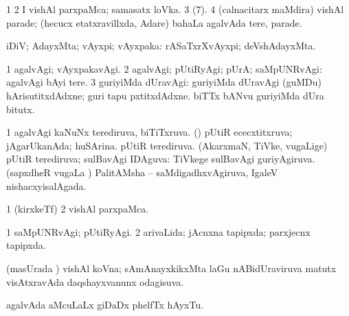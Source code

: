 {{{{{{\noindent 
\gl{\pagu}
\bmng
\bnum
\num{1}  
\num{2}  I vishAl parxpaMca; samasatx loVka. 
\num{3}  (\pagu $7$). 
\num{4}  (calnacitarx maMdira) vishAl parade; (hecucx etatxravillxda, Adare) bahaLa agalvAda tere, parade. 
\enum
\emng
\eentry

\bentry
{} 
\gl{\saupa}
\bmng
iDiV; AdayxMta; vAyxpi; vAyxpaka:  rASaTxrXvAyxpi; deVshAdayxMta. 
\emng
\eentry

\bentry
{} 
\gl{\kirxvi}
\expl{}
\bmng
\bnum
\num{1} agalvAgi; vAyxpakavAgi. 
\num{2} agalvAgi; pUtiRyAgi; pUrA; saMpUNRvAgi:  agalvAgi bAyi tere. 
\num{3} guriyiMda dUravAgi:  guriyiMda dUravAgi (guMDu) hArisutitxdAdxne; guri tapu pxtitxdAdxne.  biTTx bANvu guriyiMda dUra bitutx. 
\enum
\emng

\noindent 
\gl{\pagu}
\bmng
\bnum
\num{1}  
  
\banum
{} agalvAgi kaNuNx terediruva, biTiTxruva. 
 (\AmA) pUtiR ececxtitxruva; jAgarUkanAda; huSArina. 
\eanum
\numie
{}  
\banum
{} pUtiR terediruva. 
 (AkarxmaN, TiVke, \mo vugaLige) pUtiR terediruva; sulBavAgi IDAguva:  TiVkege sulBavAgi guriyAgiruva. 
 (sapxdheR \mo vugaLa \vi) PalitAMsha -- saMdigadhxvAgiruva, IgaleV nishacxyisalAgada. 
\eanum
\numie
\enum
\emng
\eentry

\bentry
{} 
\gl{\nA}
\expl{}
\bmng
\bnum
\num{1} (kirxkeTf)  
\num{2}  vishAl parxpaMca. 
\enum
\emng

\noindent 
\gl{\pagu}
\bmng
\bnum
\num{1}  saMpUNRvAgi; pUtiRyAgi. 
\num{2}  arivaLida; jAcnxna tapipxda; parxjecnx tapipxda. 
\enum
\emng
\eentry

\bentry
{} 
\gl{\gu}
\expl{}
\bmng
(masUrada \vi) vishAl koVna; sAmAnayxkikxMta laGu nABidUraviruva matutx visAtxravAda daqshayxvanunx odagisuva. 
\emng
\eentry

\bentry
{}
  \gl{\nA}\bmng
agalvAda aMcuLaLx giDaDx phelfTx hAyxTu. 
\emng
\eentry

}}}}}}
